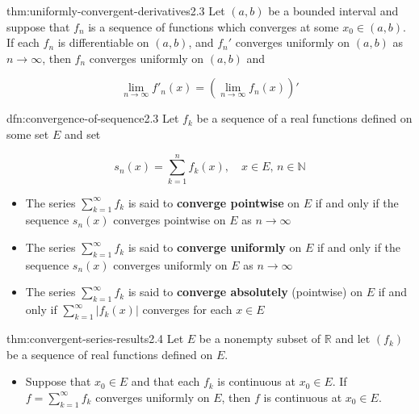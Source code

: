\documentclass[landscape, 8pt]{extarticle}
\begin{document}
\begin{multicols}{3}
\begin{thm}[]{thm:uniformly-convergent-derivatives}{2.3}
	Let $(a,b)$ be a bounded interval and suppose that $f_{n}$ is a sequence of functions which converges at some $x_{0}\in(a,b)$. If each $f_{n}$ is differentiable on $(a,b)$, and $f_{n}'$ converges uniformly on $(a,b)$ as $n\to\infty$, then $f_{n}$ converges uniformly on $(a,b)$ and

	\[\lim_{n \to \infty} f'_{n}(x)=\left(\lim_{n \to \infty} f_{n}(x)\right)'\]
\end{thm}

\newpage

\begin{dfn}{dfn:convergence-of-sequence}{2.3}
	Let $f_{k}$ be a sequence of a real functions defined on some set $E$ and set

	\[s_{n}(x)=\sum_{k=1}^{n} f_{k}(x),\quad x\in E,\,n\in \mathbb{N}\]
	\begin{itemize}
		\setlength\itemsep{0em}
		\item The series $\displaystyle\sum_{k=1}^{\infty} f_{k}$ is said to \textbf{converge pointwise} on $E$ if and only if the sequence $s_{n}(x)$ converges pointwise on $E$ as $n\to\infty$

		\item The series $\displaystyle\sum_{k=1}^{\infty} f_{k}$ is said to \textbf{converge uniformly} on $E$ if and only if the sequence $s_{n}(x)$ converges uniformly on $E$ as $n\to\infty$

		\item The series $\displaystyle\sum_{k=1}^{\infty} f_{k}$ is said to \textbf{converge absolutely} (pointwise) on $E$ if and only if $\displaystyle\sum_{k=1}^{\infty} \lvert f_{k}(x) \rvert$ converges for each $x\in E$

	\end{itemize}
\end{dfn}

\begin{thm}{thm:convergent-series-results}{2.4}
	Let $E$ be a nonempty subset of $\mathbb{R}$ and let $(f_{k})$ be a sequence of real functions defined on $E$.

	\begin{itemize}
		\setlength\itemsep{0em}
		\item Suppose that $x_{0}\in E$ and that each $f_{k}$ is continuous at $x_{0}\in E$. If $f=\displaystyle\sum_{k=1}^{\infty}f_{k}$ converges uniformly on $E$, then $f$ is continuous at $x_{0}\in E$.


\end{itemize}
\end{thm}
\end{multicols}
\end{document}
